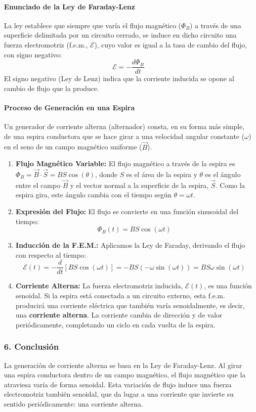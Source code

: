 \paragraph{Enunciado de la Ley de Faraday-Lenz}
La ley establece que siempre que varía el flujo magnético ($\Phi_B$) a través de una superficie delimitada por un circuito cerrado, se induce en dicho circuito una fuerza electromotriz (f.e.m., $\mathcal{E}$), cuyo valor es igual a la tasa de cambio del flujo, con signo negativo:
$$ \mathcal{E} = - \frac{d\Phi_B}{dt} $$
El signo negativo (Ley de Lenz) indica que la corriente inducida se opone al cambio de flujo que la produce.

\paragraph{Proceso de Generación en una Espira}
Un generador de corriente alterna (alternador) consta, en su forma más simple, de una espira conductora que se hace girar a una velocidad angular constante ($\omega$) en el seno de un campo magnético uniforme ($\vec{B}$).
\begin{enumerate}
    \item \textbf{Flujo Magnético Variable:} El flujo magnético a través de la espira es $\Phi_B = \vec{B} \cdot \vec{S} = B S \cos(\theta)$, donde $S$ es el área de la espira y $\theta$ es el ángulo entre el campo $\vec{B}$ y el vector normal a la superficie de la espira, $\vec{S}$. Como la espira gira, este ángulo cambia con el tiempo según $\theta = \omega t$.
    \item \textbf{Expresión del Flujo:} El flujo se convierte en una función sinusoidal del tiempo:
    $$ \Phi_B(t) = B S \cos(\omega t) $$
    \item \textbf{Inducción de la F.E.M.:} Aplicamos la Ley de Faraday, derivando el flujo con respecto al tiempo:
    $$ \mathcal{E}(t) = - \frac{d}{dt} [B S \cos(\omega t)] = - B S (-\omega \sin(\omega t)) = B S \omega \sin(\omega t) $$
    \item \textbf{Corriente Alterna:} La fuerza electromotriz inducida, $\mathcal{E}(t)$, es una función senoidal. Si la espira está conectada a un circuito externo, esta f.e.m. producirá una corriente eléctrica que también varía senoidalmente, es decir, una \textbf{corriente alterna}. La corriente cambia de dirección y de valor periódicamente, completando un ciclo en cada vuelta de la espira.
\end{enumerate}

\subsubsection*{6. Conclusión}
\begin{cajaconclusion}
La generación de corriente alterna se basa en la Ley de Faraday-Lenz. Al girar una espira conductora dentro de un campo magnético, el flujo magnético que la atraviesa varía de forma senoidal. Esta variación de flujo induce una fuerza electromotriz también senoidal, que da lugar a una corriente que invierte su sentido periódicamente: una corriente alterna.
\end{cajaconclusion}

